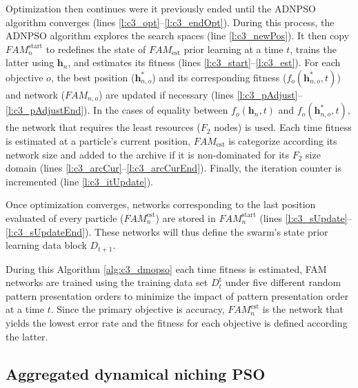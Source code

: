 Optimization then continues were it previously ended until the ADNPSO algorithm converges (lines \ref{l:c3_opt}--\ref{l:c3_endOpt}).
During this process, the ADNPSO algorithm explores the search spaces (line \ref{l:c3_newPos}).
It then copy $\textit{FAM}_n^\text{start}$ to redefines the state of $\textit{FAM}_\text{est}$ prior learning at a time $t$, trains the latter using $\textbf{h}_n$, and estimates its fitness (lines \ref{l:c3_start}--\ref{l:c3_est}).
For each objective $o$, the best position ($\textbf{h}^*_{n,o}$) and its corresponding fitness ($f_o(\textbf{h}^*_{n,o},t)$) and network ($\textit{FAM}_{n,o}$) are updated if necessary (lines \ref{l:c3_pAdjust}--\ref{l:c3_pAdjustEnd}).
In the cases of equality between $f_o(\textbf{h}_n,t)$ and $f_o(\textbf{h}^*_{n,o},t)$, the network that requires the least resources ($F_2$ nodes) is used.
Each time fitness is estimated at a particle's current position, $\textit{FAM}_\text{est}$ is categorize according its network size and added to the archive if it is non-dominated for its $F_2$ size domain (lines \ref{l:c3_arcCur}--\ref{l:c3_arcCurEnd}). 
Finally, the iteration counter is incremented (line \ref{l:c3_itUpdate}).

Once optimization converges, networks corresponding to the last position evaluated of every particle ($\textit{FAM}_n^\text{est}$) are stored in $\textit{FAM}_n^\text{start}$ (lines \ref{l:c3_sUpdate}--\ref{l:c3_sUpdateEnd}).
These networks will thus define the swarm's state prior learning data block $D_{t+1}$.

During this Algorithm \ref{alg:c3_dmopso} each time fitness is estimated, FAM networks are trained using the training data set $D_t^\text{t}$ under five different random pattern presentation orders to minimize the impact of pattern presentation order at a time $t$.
Since the primary objective is accuracy, $\textit{FAM}_n^\text{est}$ is the network that yields the lowest error rate and the fitness for each objective is defined according the latter.

\subsection{Aggregated dynamical niching PSO}
\label{sec:c3_adnpso}

